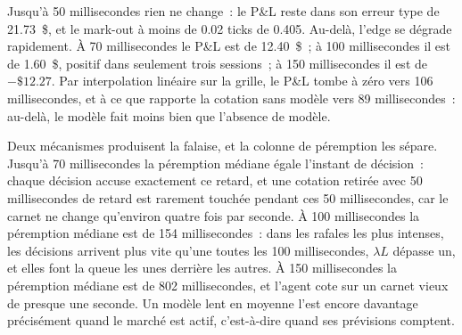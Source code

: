 \begin{omfigure}

\label{fig:ml:lob:pnl}
\end{omfigure}

Jusqu'à 50 millisecondes rien ne change~: le P\&L reste dans son erreur type de 21.73~\$, et le mark-out à moins de 0.02 ticks de
0.405. Au-delà, l'edge se dégrade rapidement. À 70 millisecondes le P\&L est de 12.40~\$~; à 100 millisecondes il est de 1.60~\$, positif dans
seulement trois sessions~; à 150 millisecondes il est de $-\$12.27$. Par interpolation linéaire sur la grille, le P\&L tombe à zéro vers 106
millisecondes, et à ce que rapporte la cotation sans modèle vers 89 millisecondes~: au-delà, le modèle fait moins bien que l'absence de modèle.

Deux mécanismes produisent la falaise, et la colonne de péremption les sépare. Jusqu'à 70 millisecondes la péremption médiane égale
l'instant de décision~: chaque décision accuse exactement ce retard, et une cotation retirée avec 50 millisecondes de retard est rarement touchée pendant ces 50
millisecondes, car le carnet ne change qu'environ quatre fois par seconde. À 100 millisecondes la péremption médiane est de 154
millisecondes~: dans les rafales les plus intenses, les décisions arrivent plus vite qu'une toutes les 100 millisecondes, $\lambda L$ dépasse un, et elles font la queue
les unes derrière les autres. À 150 millisecondes la péremption médiane est de 802 millisecondes, et l'agent cote sur un carnet vieux de presque une
seconde. Un modèle lent en moyenne l'est encore davantage précisément quand le marché est actif, c'est-à-dire quand ses prévisions comptent.

